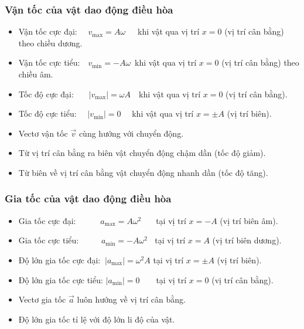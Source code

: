 \subsubsection{Vận tốc của vật dao động điều hòa}
\centerline{}
\begin{itemize}
\item Vận tốc cực đại: \ \ $v_{\max}=A\omega$\ \ \ khi vật qua vị trí $x=0$ (vị trí cân bằng) theo chiều dương.
\item Vận tốc cực tiểu:\ \  $v_{\min}=-A\omega$\ khi vật qua vị trí $x=0$ (vị trí cân bằng) theo chiều âm.
\item Tốc độ cực đại: \ \ \ $\left|v_{\max}\right|=\omega A$\ \ khi vật qua vị trí $x=0$ (vị trí cân bằng).
\item Tốc độ cực tiểu: \ \ $\left|v_{\min}\right|=0\ $ $\ \ $ khi vật qua vị trí $x=\pm A$ (vị trí biên).
\end{itemize}
\begin{note}
\begin{itemize}
\item Vectơ vận tốc $\vec{v}$ cùng hướng với chuyển động. 
\item Từ vị trí cân bằng ra biên vật chuyển động chậm dần (tốc độ giảm). 
\item Từ biên về vị trí cân bằng vật chuyển động nhanh dần (tốc độ tăng).
\end{itemize}
\end{note}
\subsubsection{Gia tốc của vật dao động điều hòa}
\centerline{}
\begin{itemize}
\item Gia tốc cực đại:$\  \ \ \ \ \ \ \ \ \ \ \ $ $a_{\max}=A\omega^2$ $\ \ $\ \  tại vị trí $x=-A$ (vị trí biên âm).
\item Gia tốc cực tiểu:$\  \ \ \ \ \ \ \ \ \ \ $ $a_{\min}=-A\omega^2$ $\ $ tại vị trí $x=A$ (vị trí biên dương).
\item Độ lớn gia tốc cực đại:$\ $ $\left|a_{\max}\right|=\omega^2A$ tại vị trí $x=\pm A$ (vị trí biên).
\item Độ lớn gia tốc cực tiểu: $\left|a_{\min}\right|=0$ $\ \ \ \ \ \ $ tại vị trí $x=0$ (vị trí cân bằng).
\end{itemize}
\begin{note}
\begin{itemize}
\item Vectơ gia tốc $\vec{a}$ luôn hướng về vị trí cân bằng.
\item Độ lớn gia tốc tỉ lệ với độ lớn li độ của vật.
\end{itemize}
\end{note}